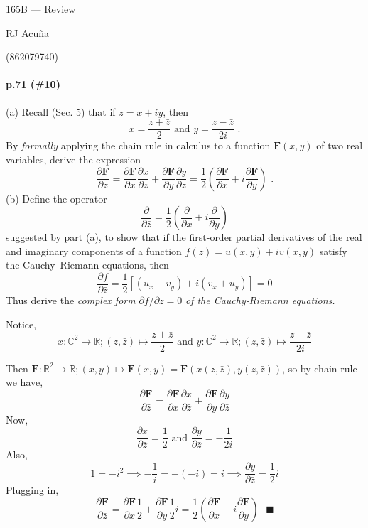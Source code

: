 \documentclass{article}
\newcommand\R{\mathbb{R}}
\newcommand\C{\mathbb{C}}
\begin{document}
\begin{center}
  165B --- Review

  RJ Acuña

  (862079740)
\end{center}\vspace{1.618em}

\paragraph{p.71 \color{blue}(\#10)\color{black}}

(a) Recall (Sec. 5) that if $z = x + iy$, then
\[x = \frac{z + \bar{z}}{2}\text{ and } y = \frac{z -
    \bar{z}}{2i}\text{ .}\]
By \textit{formally} applying the chain rule in calculus to a function
$\mathbf{F} (x, y)$ of two real
variables, derive the expression
\[\frac{\partial{\mathbf{F}}}{\partial{\bar{z}}} =
  \frac{\partial{\mathbf{F}}}{\partial{x}}\frac{\partial{x}}{\partial{\bar{z}}}
  + \frac{\partial{\mathbf{F}}}{\partial{y}}
  \frac{\partial{y}}{\partial{\bar{z}}} = \frac{1}{2}\left(\frac{\partial{\mathbf{F}}}{\partial{x}}
    + i\frac{\partial{\mathbf{F}}}{\partial{y}}
  \right)\text{ .}\]
(b) Define the operator
\[\frac{\partial}{\partial{\bar{z}}} = \frac{1}{2}\left(
    \frac{\partial}{\partial{x}}+i\frac{\partial}{\partial{y}}
  \right)\]
suggested by part (a), to show that if the first-order partial derivatives of the
real and imaginary components of a function $f (z) = u(x, y) + iv(x, y)$ satisfy
the Cauchy–Riemann equations, then
\[\frac{\partial{f}}{\partial{\bar{z}}} = \frac{1}{2}\left[ (u_x -
    v_y) +i(v_x + u_y) \right] = 0\]
Thus derive the \textit{complex form} $\partial{f}/\partial{\bar{z}} =
0$ \textit{of the Cauchy-Riemann equations.}


Notice,
\[x:\C^2\rightarrow \R; (z,\bar{z})\mapsto
  \frac{z+\bar{z}}{2}\text{ and } y:\C^2\rightarrow \R; (z,\bar{z})\mapsto
  \frac{z-\bar{z}}{2i}\]

Then $\mathbf{F}:\R^2\rightarrow \R; (x,y)\mapsto \mathbf{F}(x,y) = \mathbf{F}(x(z,\bar{z}),y(z,\bar{z}))$, so by chain rule we have,
\[\frac{\partial{\mathbf{F}}}{\partial{\bar{z}}} =
  \frac{\partial{\mathbf{F}}}{\partial{x}}\frac{\partial{x}}{\partial{\bar{z}}}
  + \frac{\partial{\mathbf{F}}}{\partial{y}}
  \frac{\partial{y}}{\partial{\bar{z}}}\]
Now,
\[\frac{\partial{x}}{\partial{\bar{z}}} = \frac{1}{2}\text{ and
  }\frac{\partial{y}}{\partial{\bar{z}}} = -\frac{1}{2i}\]
Also,
\[1= -i^2 \implies -\frac{1}{i} = -(-i) = i \implies \frac{\partial{y}}{\partial{\bar{z}}} = \frac{1}{2}i\]
Plugging in,
\[\frac{\partial{\mathbf{F}}}{\partial{\bar{z}}} =
  \frac{\partial{\mathbf{F}}}{\partial{x}}\frac{1}{2}
  + \frac{\partial{\mathbf{F}}}{\partial{y}}\frac{1}{2}i = \frac{1}{2}\left(\frac{\partial{\mathbf{F}}}{\partial{x}}
    + i\frac{\partial{\mathbf{F}}}{\partial{y}}
  \right)\text{ }\blacksquare\]
\end{document}
